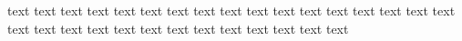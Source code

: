 \documentclass{article}
\begin{document}
text text text text text text text text text text text text text text text
text text text text text text text text text text text text text text text
\end{document}
